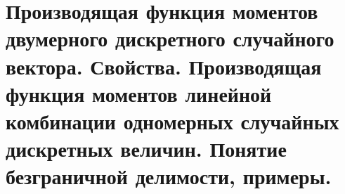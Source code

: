 \documentclass[polytech/stats/exam-2023/stats-exam-2023.tex]{subfiles}
\begin{document}
\section{Производящая функция моментов двумерного дискретного случайного вектора. Свойства. Производящая функция моментов линейной комбинации одномерных случайных дискретных величин. Понятие безграничной делимости, примеры.}
\end{document}
